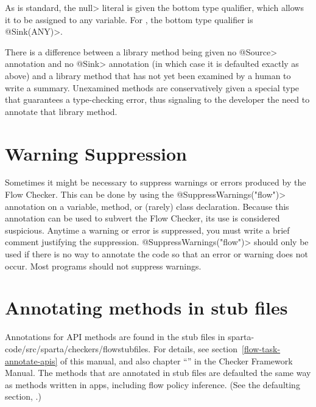 
As is standard, the \<null> literal is given the bottom type qualifier, which allows it to be assigned to any variable.
For \theFlowChecker, the bottom type qualifier is \srcnone \<@Sink(ANY)>.

There is a difference between a library method being given no \<@Source>
annotation and no \<@Sink> annotation (in which case it is defaulted
exactly as above) and a library method that has not yet been examined by a
human to write a summary.  Unexamined methods are conservatively given a special
type that guarantees a type-checking error, thus signaling to the
developer the need to annotate that library method.


\section{Warning Suppression\label{sec:waringsuppression}}
 
Sometimes it might be necessary to suppress warnings or errors produced by
the Flow Checker.  This can be done by using the
\<@SuppressWarnings("flow")> annotation on a variable, method, or (rarely)
class declaration.  Because this annotation can be used to subvert the Flow
Checker, its use is considered suspicious.  Anytime a warning or error is
suppressed, you must write a brief comment justifying the suppression.
\<@SuppressWarnings("flow")> should only be used if there is no way to
annotate the code so that an error or warning does not occur.  Most
programs should not suppress warnings.


\section{Annotating methods in stub files\label{sec:apispecs}}

Annotations for API methods are found in the stub files in sparta-code/src/sparta/checkers/flowstubfiles.
For details, see section~\ref{flow-task-annotate-apis} of this manual, and also 
chapter
``'' in the Checker Framework Manual.  
 The methods that are annotated in stub files are defaulted the same way as methods 
written in apps, including flow policy inference.  
(See the defaulting section, .) 

